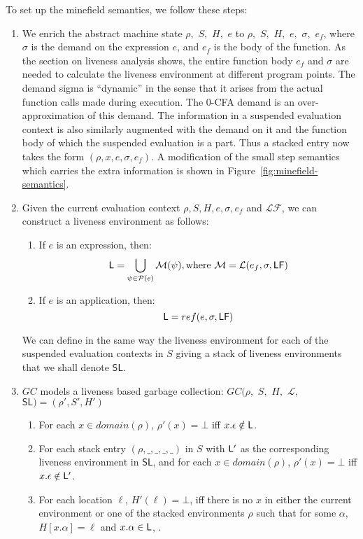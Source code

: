 \documentclass[9pt]{sigplanconf}
\begin{document}
To set up the minefield semantics, we follow these steps:
\begin{enumerate}
\item We enrich  the abstract machine state $\rho,$ $S,$  $ H,$ $e$ to
  $\rho,$ $S,$ $H,$ $e,$ $\sigma,$ $e_f$, where $\sigma$ is the demand
  on the expression $e$, and $e_f$ is the body of the function. As the
  section on liveness  analysis shows, the entire  function body $e_f$
  and $\sigma$  are needed  to calculate  the liveness  environment at
  different program  points. The  demand sigma  is ``dynamic''  in the
  sense  that it  arises from  the actual  function calls  made during
  execution.   The  0-CFA  demand  is an  over-approximation  of  this
  demand.  The information  in a suspended evaluation  context is also
  similarly augmented with  the demand on it and the  function body of
  which the suspended evaluation is a  part.  Thus a stacked entry now
  takes the  form $(\rho, x, e,  \sigma, e_f)$. A modification  of the
  small step semantics which carries the extra information is shown in
  Figure~\ref{fig:minefield-semantics}.
\item Given  the current  evaluation context $\rho,  S, H,  e, \sigma,
  e_f$ and $\mathcal{LF}$, we can construct a liveness environment as follows:
  \begin{enumerate}
  \item If $e$ is an expression, then:  
  $$ \mathsf{L} = \bigcup_{\psi \in \mathcal{P}(e)} \mathcal{M}(\psi),
    \text{where }
  \mathcal{M} = \mathcal{L}(e_f, \sigma, \mathsf{LF})$$
\item If $e$ is an application, then:  
  $$ \mathsf{L} = ref(e, \sigma, \mathsf{LF})$$
  \end{enumerate}
We can define in the same way the liveness environment for each of the
suspended  evaluation contexts in  $S$  giving  a  stack of  liveness
environments that we shall denote $\mathsf{SL}$.
\item $GC$ models a liveness based garbage collection:
$GC(\rho,$ $ S,$ $ H,$ $ \mathcal{L},$ $ \mathsf{SL}) = (\rho', S', H')$ 
  \begin{enumerate}
  \item For each $x \in domain(\rho)$,  $\rho'(x)=\bot$ iff $x.\epsilon
    \notin \mathsf{L}$.
\item For each stack entry $(\rho,\_,\_,\_,\_)$ in $S$ with $\mathsf{L}'$ as
  the corresponding liveness environment in $\mathsf{SL}$,  and for each $x
  \in domain(\rho)$,  $\rho'(x)=\bot$
  iff $x.\epsilon \notin \mathsf{L}'$.
\item For each location $\ell$, $H'(\ell) = \bot$, iff  there is no
  $x$ in either the current environment or one of the stacked
  environments $\rho$ such that for some $\alpha$, $H[x.\alpha] =
  \ell$  and $x.\alpha \in \mathsf{L}$, .
  \end{enumerate}
\end{enumerate}
\end{document}
